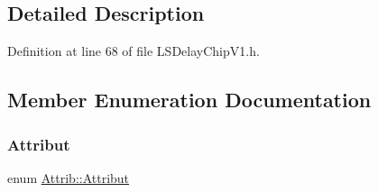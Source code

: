 \subsection{Detailed Description}


Definition at line 68 of file L\+S\+Delay\+Chip\+V1.\+h.



\subsection{Member Enumeration Documentation}
\mbox{\label{classAttrib_a69e171d7cc6417835a5a306d3c764235}} 
\subsubsection{\texorpdfstring{Attribut}{Attribut}}
{\footnotesize\ttfamily enum \hyperlink{classAttrib_a69e171d7cc6417835a5a306d3c764235}{Attrib\+::\+Attribut}\hspace{0.3cm}{\ttfamily [inherited]}}

